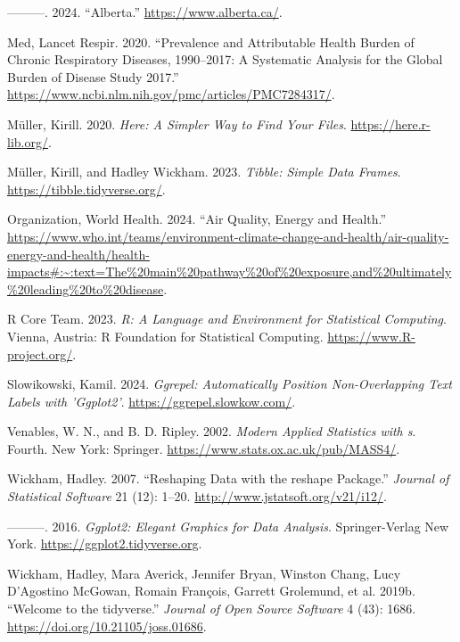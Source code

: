 \documentclass[
  letterpaper,
  DIV=11,
  numbers=noendperiod]{scrartcl}
\newlength{\cslhangindent}
\newenvironment{CSLReferences}[2] %
 {\begin{list}{}{%
  \setlength{\itemindent}{0pt}
  \setlength{\leftmargin}{0pt}
  \setlength{\parsep}{0pt}
  \ifodd #1
   \setlength{\leftmargin}{\cslhangindent}
   \setlength{\itemindent}{-1\cslhangindent}
  \fi
  \setlength{\itemsep}{#2\baselineskip}}}
 {\end{list}}
\begin{document}
\begin{CSLReferences}{1}{0}
---------. 2024. {``Alberta.''} \url{https://www.alberta.ca/}.

Med, Lancet Respir. 2020. {``Prevalence and Attributable Health Burden
of Chronic Respiratory Diseases, 1990--2017: A Systematic Analysis for
the Global Burden of Disease Study 2017.''}
\url{https://www.ncbi.nlm.nih.gov/pmc/articles/PMC7284317/}.

Müller, Kirill. 2020. \emph{Here: A Simpler Way to Find Your Files}.
\url{https://here.r-lib.org/}.

Müller, Kirill, and Hadley Wickham. 2023. \emph{Tibble: Simple Data
Frames}. \url{https://tibble.tidyverse.org/}.

Organization, World Health. 2024. {``Air Quality, Energy and Health.''}
\url{https://www.who.int/teams/environment-climate-change-and-health/air-quality-energy-and-health/health-impacts\#:~:text=The\%20main\%20pathway\%20of\%20exposure,and\%20ultimately\%20leading\%20to\%20disease}.

R Core Team. 2023. \emph{R: A Language and Environment for Statistical
Computing}. Vienna, Austria: R Foundation for Statistical Computing.
\url{https://www.R-project.org/}.

Slowikowski, Kamil. 2024. \emph{Ggrepel: Automatically Position
Non-Overlapping Text Labels with 'Ggplot2'}.
\url{https://ggrepel.slowkow.com/}.

Venables, W. N., and B. D. Ripley. 2002. \emph{Modern Applied Statistics
with s}. Fourth. New York: Springer.
\url{https://www.stats.ox.ac.uk/pub/MASS4/}.

Wickham, Hadley. 2007. {``Reshaping Data with the {reshape} Package.''}
\emph{Journal of Statistical Software} 21 (12): 1--20.
\url{http://www.jstatsoft.org/v21/i12/}.

---------. 2016. \emph{Ggplot2: Elegant Graphics for Data Analysis}.
Springer-Verlag New York. \url{https://ggplot2.tidyverse.org}.

Wickham, Hadley, Mara Averick, Jennifer Bryan, Winston Chang, Lucy
D'Agostino McGowan, Romain François, Garrett Grolemund, et al. 2019b.
{``Welcome to the {tidyverse}.''} \emph{Journal of Open Source Software}
4 (43): 1686. \url{https://doi.org/10.21105/joss.01686}.


\end{CSLReferences}
\end{document}
